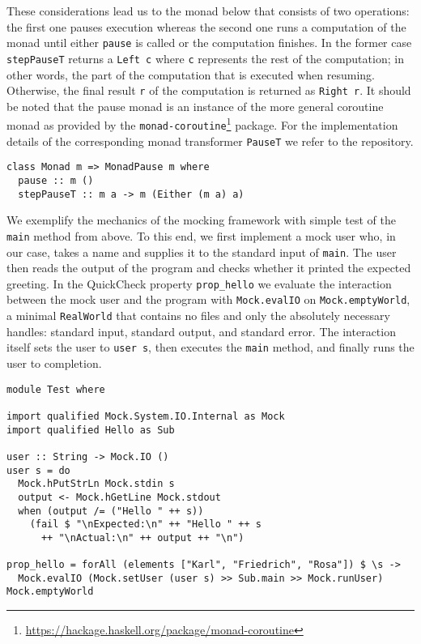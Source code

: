 These considerations lead us to the monad below that consists of two operations: the first one pauses execution whereas the second one runs a computation of the monad until either \texttt{pause} is called or the computation finishes.
In the former case \texttt{stepPauseT} returns a \texttt{Left c} where \texttt{c} represents the rest of the computation; in other words, the part of the computation that is executed when resuming. 
Otherwise, the final result \texttt{r} of the computation is returned as \texttt{Right r}.
It should be noted that the pause monad is an instance of the more general coroutine monad as provided by the \texttt{monad-coroutine}\footnote{\url{https://hackage.haskell.org/package/monad-coroutine}} package.
For the implementation details of the corresponding monad transformer \texttt{PauseT} we refer to the repository.
\begin{verbatim}
class Monad m => MonadPause m where
  pause :: m ()
  stepPauseT :: m a -> m (Either (m a) a)
\end{verbatim}
We exemplify the mechanics of the mocking framework with simple test of the \texttt{main} method from above.
To this end, we first implement a mock user who, in our case, takes a name and supplies it to the standard input of \texttt{main}.
The user then reads the output of the program and checks whether it printed the expected greeting.
In the QuickCheck property \texttt{prop_hello} we evaluate the interaction between the mock user and the program with \texttt{Mock.evalIO} on \texttt{Mock.emptyWorld}, a minimal \texttt{RealWorld} that contains no files and only the absolutely necessary handles: standard input, standard output, and standard error.
The interaction itself sets the user to \texttt{user s}, then executes the \texttt{main} method, and finally runs the user to completion.
\begin{verbatim}
module Test where

import qualified Mock.System.IO.Internal as Mock
import qualified Hello as Sub

user :: String -> Mock.IO ()
user s = do
  Mock.hPutStrLn Mock.stdin s
  output <- Mock.hGetLine Mock.stdout
  when (output /= ("Hello " ++ s))
    (fail $ "\nExpected:\n" ++ "Hello " ++ s
      ++ "\nActual:\n" ++ output ++ "\n")

prop_hello = forAll (elements ["Karl", "Friedrich", "Rosa"]) $ \s ->
  Mock.evalIO (Mock.setUser (user s) >> Sub.main >> Mock.runUser) Mock.emptyWorld
\end{verbatim}
